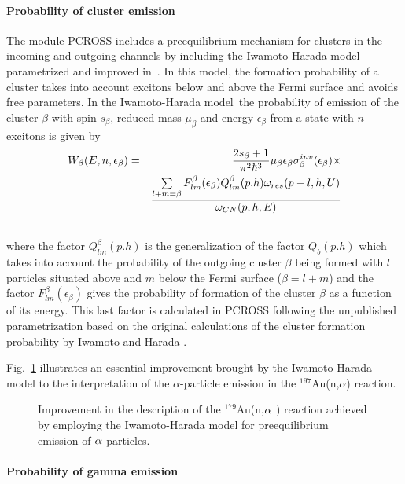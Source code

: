 \paragraph{Probability of cluster emission}

The module PCROSS includes a preequilibrium mechanism for clusters in the
incoming and outgoing channels by including the Iwamoto-Harada model~\cite%
{Iwamoto:82} parametrized and improved in~\cite{Sato:83,Shang:88,Shang:89}.
In this model, the formation probability of a cluster takes into account
excitons below and above the Fermi surface and avoids free parameters. In
the Iwamoto-Harada model~the probability of emission of the cluster $\beta $
with spin $s_{\beta }$, reduced mass $\mu _{\beta }$ and energy $\epsilon
_{\beta }$ from a state with $n$ excitons is given by%
\begin{eqnarray}
W_{\beta }(E,n,\epsilon _{\beta })&=&\frac{2s_{\beta }+1}{\pi ^{2}\hbar ^{3}}%
\mu _{\beta }\epsilon _{\beta }\sigma _{\beta }^{inv}(\epsilon _{\beta
})\times  \notag \\
&&\frac{\sum\limits_{l+m=\beta }F_{lm}^{\beta }(\epsilon _{\beta
})Q_{lm}^{\beta }(p.h)\omega _{res}(p-l,h,U)}{\omega _{CN}(p,h,E)}  \notag \\
&&
\end{eqnarray}%
where the factor $Q_{lm}^{\beta }(p.h)$ is the generalization of the factor $%
Q_{b}(p.h)$ which takes into account the probability of the outgoing cluster
$\beta $ being formed with $l$ particles situated above and $m$ below the
Fermi surface ($\beta =l+m$) \cite{Shang:89} and the factor $F_{lm}^{\beta
}(\epsilon _{\beta })$ gives the probability of formation of the cluster $%
\beta $ as a function of its energy. This last factor is calculated in
PCROSS following the unpublished parametrization based on the original
calculations of the cluster formation probability by Iwamoto and Harada \cite{Iwamoto:82}.

Fig.~\ref{goldna} illustrates an essential
improvement brought by the Iwamoto-Harada model to the interpretation of the $\alpha$-particle emission in the $^{197}$Au(n,$\alpha $) reaction.
\begin{figure}[tbph]
\caption{Improvement in the description of the $^{179}$Au(n,$\protect\alpha $%
) reaction achieved by employing the Iwamoto-Harada model for preequilibrium
emission of $\protect\alpha $-particles.}
\label{goldna}
\end{figure}

\paragraph{Probability of gamma emission}

